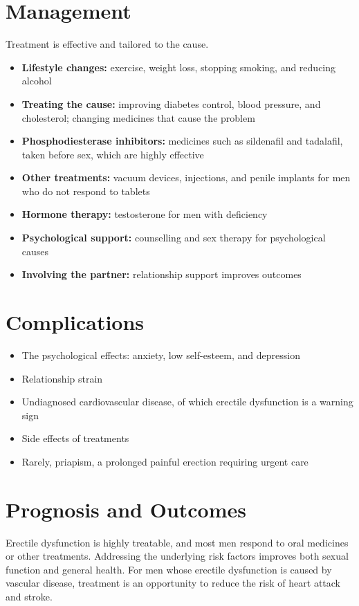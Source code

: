 \section*{Management}
Treatment is effective and tailored to the cause.
\begin{itemize}
    \item \textbf{Lifestyle changes:} exercise, weight loss, stopping smoking, and reducing alcohol
    \item \textbf{Treating the cause:} improving diabetes control, blood pressure, and cholesterol; changing medicines that cause the problem
    \item \textbf{Phosphodiesterase inhibitors:} medicines such as sildenafil and tadalafil, taken before sex, which are highly effective
    \item \textbf{Other treatments:} vacuum devices, injections, and penile implants for men who do not respond to tablets
    \item \textbf{Hormone therapy:} testosterone for men with deficiency
    \item \textbf{Psychological support:} counselling and sex therapy for psychological causes
    \item \textbf{Involving the partner:} relationship support improves outcomes
\end{itemize}

\section*{Complications}
\begin{itemize}
    \item The psychological effects: anxiety, low self-esteem, and depression
    \item Relationship strain
    \item Undiagnosed cardiovascular disease, of which erectile dysfunction is a warning sign
    \item Side effects of treatments
    \item Rarely, priapism, a prolonged painful erection requiring urgent care
\end{itemize}

\section*{Prognosis and Outcomes}
Erectile dysfunction is highly treatable, and most men respond to oral medicines or other treatments. Addressing the underlying risk factors improves both sexual function and general health. For men whose erectile dysfunction is caused by vascular disease, treatment is an opportunity to reduce the risk of heart attack and stroke.

